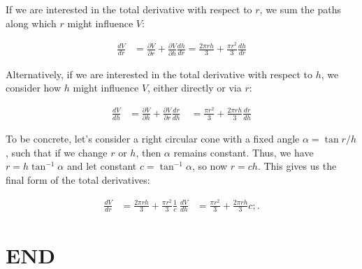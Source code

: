     If we are interested in the total derivative with respect to $r$, we sum the paths along which $r$ might influence $V$:
    
    \begin{align*}
    \frac{dV}{dr} & = \frac{\partial V}{\partial r} + \frac{\partial V}{\partial h} \frac{dh}{dr} 
     = \frac{2 \pi r h}{3} + \frac{\pi r^2}{3} \frac{dh}{dr}
    \end{align*}
    
    Alternatively, if we are interested in the total derivative with respect to $h$, we consider how $h$ might influence $V$, either directly or via $r$:
    
    \begin{align*}
    \frac{dV}{dh} & = \frac{\partial V}{\partial h} + \frac{\partial V}{\partial r} \frac{dr}{dh} \
    & = \frac{\pi r^2}{3} + \frac{2 \pi r h}{3} \frac{dr}{dh}
    \end{align*}
    
    To be concrete, let's consider a right circular cone with a fixed angle $\alpha = \tan r / h$, such that if we change $r$ or $h$, then $\alpha$ remains constant. Thus, we have $r = h \tan^{-1} \alpha$ and let constant $c = \tan^{-1} \alpha$, so now $r = c h$. This gives us the final form of the total derivatives:
    
    \begin{align*}
    \frac{dV}{dr} & = \frac{2 \pi r h}{3} + \frac{\pi r^2}{3} \frac{1}{c} \
    \frac{dV}{dh} & = \frac{\pi r^2}{3} + \frac{2 \pi r h}{3} c ; .
    \end{align*}
    















    
\section{END}






    

\bigskip


